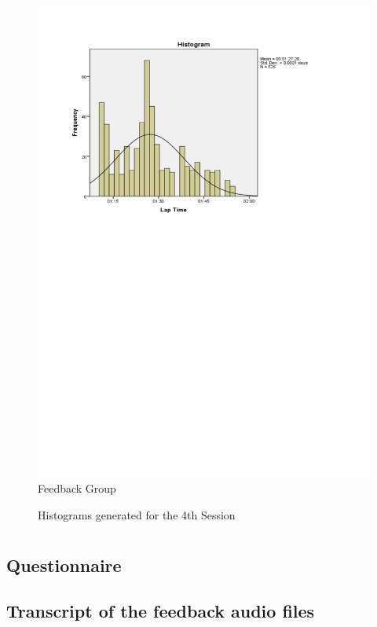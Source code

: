 \begin{figure}
\begin{minipage}{0.45\textwidth}
		\includegraphics[width=\textwidth]{charts/4-1}
		Feedback Group
	\end{minipage}
	\caption{Histograms generated for the 4th Session}
	\label{fig:hist-4}
\end{figure}

\chapter{}

%
\section{Questionnaire}
%



\section{Transcript of the feedback audio files}

